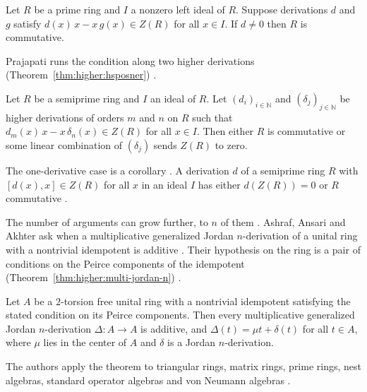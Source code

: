 \begin{theorem}\label{thm:higher:bresarB-brief}
Let $R$ be a prime ring and $I$ a nonzero left ideal of $R$. Suppose
derivations $d$ and $g$ satisfy $d(x)\,x-x\,g(x)\in Z(R)$ for all $x\in I$.
If $d\neq 0$ then $R$ is commutative.
\end{theorem}

Prajapati runs the condition along two higher derivations (Theorem~\ref{thm:higher:hsposner})
\cite[p.~9]{Prajapati2021}.\begin{theorem}\label{thm:higher:hsposner}
Let $R$ be a semiprime ring and $I$ an ideal of $R$. Let $(d_i)_{i\in
\mathbb{N}}$ and $(\delta_j)_{j\in\mathbb{N}}$ be higher derivations of
orders $m$ and $n$ on $R$ such that $d_m(x)\,x-x\,\delta_n(x)\in Z(R)$ for
all $x\in I$. Then either $R$ is commutative or some linear combination of
$(\delta_j)$ sends $Z(R)$ to zero.
\end{theorem}

The one-derivative case is a corollary
\cite[p.~9]{Prajapati2021}. A derivation $d$ of a semiprime ring $R$ with
$[d(x),x]\in Z(R)$ for all $x$ in an ideal $I$ has either $d(Z(R))=0$ or
$R$ commutative \cite[p.~9]{Prajapati2021}.

The number of arguments can grow further, to $n$ of them
\cite[p.~1]{AshrafAnsariAkhter2022}. Ashraf, Ansari and Akhter ask when a
multiplicative generalized Jordan $n$-derivation of a unital ring with a nontrivial
idempotent is additive \cite[p.~1]{AshrafAnsariAkhter2022}. Their hypothesis on the
ring is a pair of conditions on the Peirce components of the idempotent (Theorem~\ref{thm:higher:multi-jordan-n})
\cite[p.~3]{AshrafAnsariAkhter2022}.\begin{theorem}\label{thm:higher:multi-jordan-n}
Let $A$ be a $2$-torsion free unital ring with a nontrivial idempotent satisfying
the stated condition on its Peirce components. Then every multiplicative
generalized Jordan $n$-derivation $\Delta\colon A\to A$ is additive, and
$\Delta(t)=\mu t+\delta(t)$ for all $t\in A$, where $\mu$ lies in the center of $A$
and $\delta$ is a Jordan $n$-derivation.
\end{theorem}

The authors apply the theorem to triangular rings, matrix rings, prime rings,
nest algebras, standard operator algebras and von Neumann algebras
\cite[p.~1]{AshrafAnsariAkhter2022}.

